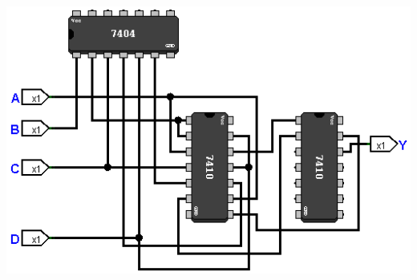 \documentclass[]{article}
\begin{document}
\begin{center}\includegraphics[scale=0.5]{Bilder/Bausteine.png}\end{center}
\end{document}

